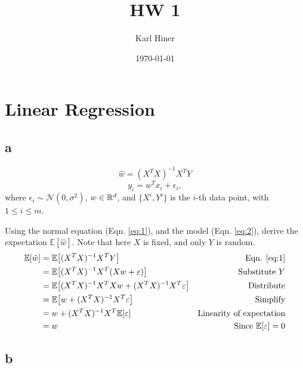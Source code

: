 \documentclass{article}
\title{HW 1}
\author{Karl Hiner}
\date{\today}
\begin{document}
\maketitle	

\section{Linear Regression}

\subsection{a}

\begin{equation} \label{eq:1}
    \hat{w} = (X^TX)^{-1}X^TY
\end{equation}
\begin{equation} \label{eq:2}
    y_i = w^T x_i + \epsilon_i,
\end{equation}
where $\epsilon_i \sim \mathcal{N}(0, \sigma^2)$, $w \in \mathbb{R}^d$, and $\{X^i, Y^i\}$ is the $i$-th data point, with $1 \leq i \leq m$.

Using the normal equation (Eqn. \ref{eq:1}), and the model (Eqn. \ref{eq:2}), derive the expectation $\mathbb{E}\left[\hat{w}\right]$.
Note that here $X$ is fixed, and only $Y$ is random.
\begin{align*}
    \mathbb{E}\left[\hat{w}\right] &= \mathbb{E}\left[(X^TX)^{-1}X^TY\right]&\text{Eqn. \ref{eq:1}}\\
    &= \mathbb{E}\left[(X^TX)^{-1}X^T\left(Xw + \epsilon\right)\right]&\text{Substitute $Y$}\\
    &= \mathbb{E}\left[(X^TX)^{-1}X^TXw + (X^TX)^{-1}X^T\epsilon\right]&\text{Distribute}\\
    &= \mathbb{E}\left[w + (X^TX)^{-1}X^T\epsilon\right]&\text{Simplify}\\
    &= w + (X^TX)^{-1}X^T\mathbb{E}\left[\epsilon\right]&\text{Linearity of expectation}\\
    &= w&\text{Since $\mathbb{E}\left[\epsilon\right] = 0$}
\end{align*}

\subsection{b}
\end{document}
